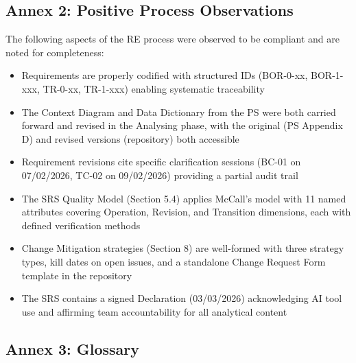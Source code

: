 \documentclass[11pt,a4paper]{article}
\begin{document}
\subsection*{Annex 2: Positive Process Observations}

The following aspects of the RE process were observed to be compliant and are noted for completeness:

\begin{itemize}[leftmargin=*]
\item Requirements are properly codified with structured IDs (BOR-0-xx, BOR-1-xxx, TR-0-xx, TR-1-xxx) enabling systematic traceability
\item The Context Diagram and Data Dictionary from the PS were both carried forward and revised in the Analysing phase, with the original (PS Appendix D) and revised versions (repository) both accessible
\item Requirement revisions cite specific clarification sessions (BC-01 on 07/02/2026, TC-02 on 09/02/2026) providing a partial audit trail
\item The SRS Quality Model (Section 5.4) applies McCall's model with 11 named attributes covering Operation, Revision, and Transition dimensions, each with defined verification methods
\item Change Mitigation strategies (Section 8) are well-formed with three strategy types, kill dates on open issues, and a standalone Change Request Form template in the repository
\item The SRS contains a signed Declaration (03/03/2026) acknowledging AI tool use and affirming team accountability for all analytical content
\end{itemize}

\subsection*{Annex 3: Glossary}
\end{document}
